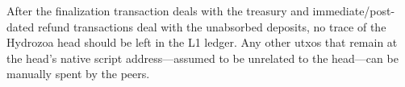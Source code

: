 \documentclass[../hydrozoa.tex]{subfiles}
\begin{document}
After the finalization transaction deals with the treasury and immediate/post-dated refund transactions deal with the unabsorbed deposits, no trace of the Hydrozoa head should be left in the L1 ledger.
Any other utxos that remain at the head's native script address---assumed to be unrelated to the head---can be manually spent by the peers.
\end{document}
